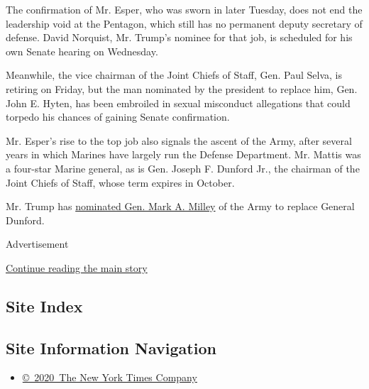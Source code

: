 The confirmation of Mr. Esper, who was sworn in later Tuesday, does not
end the leadership void at the Pentagon, which still has no permanent
deputy secretary of defense. David Norquist, Mr. Trump's nominee for
that job, is scheduled for his own Senate hearing on Wednesday.

Meanwhile, the vice chairman of the Joint Chiefs of Staff, Gen. Paul
Selva, is retiring on Friday, but the man nominated by the president to
replace him, Gen. John E. Hyten, has been embroiled in sexual misconduct
allegations that could torpedo his chances of gaining Senate
confirmation.

Mr. Esper's rise to the top job also signals the ascent of the Army,
after several years in which Marines have largely run the Defense
Department. Mr. Mattis was a four-star Marine general, as is Gen. Joseph
F. Dunford Jr., the chairman of the Joint Chiefs of Staff, whose term
expires in October.

Mr. Trump has
\href{https://www.nytimes.com/2018/12/07/us/politics/trump-mark-milley-chairman-joint-chiefs.html}{nominated
Gen. Mark A. Milley} of the Army to replace General Dunford.

Advertisement

\protect\hyperlink{after-bottom}{Continue reading the main story}

\hypertarget{site-index}{%
\subsection{Site Index}\label{site-index}}

\hypertarget{site-information-navigation}{%
\subsection{Site Information
Navigation}\label{site-information-navigation}}

\begin{itemize}
\tightlist
\item
  \href{https://help.nytimes.com/hc/en-us/articles/115014792127-Copyright-notice}{©~2020~The
  New York Times Company}
\end{itemize}

